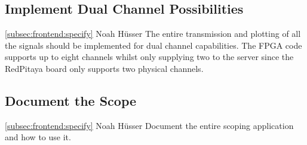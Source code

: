 \documentclass[a4paper,oneside]{alpenspecs/alpenspecs}
\begin{document}
\subsection{Implement Dual Channel Possibilities}
\label{subsec:frontend:}
\wpac
    {}
    {}
    {}
    {\ref{subsec:frontend:specify}}
    {}
    {Noah Hüsser}
    {%
        The entire transmission and plotting of all the signals should be implemented for dual channel capabilities.
        The FPGA code supports up to eight channels whilst only supplying two to the server since the RedPitaya board only supports two physical channels.
    }

\subsection{Document the Scope}
\label{subsec:frontend:}
\wpac
    {}
    {}
    {}
    {\ref{subsec:frontend:specify}}
    {}
    {Noah Hüsser}
    {%
        Document the entire scoping application and how to use it.
    }


\backmatter
\end{document}
